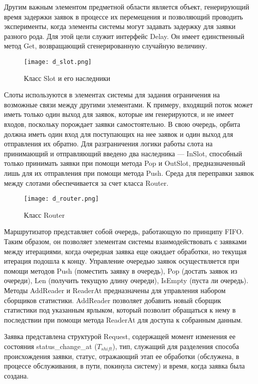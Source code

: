 Другим важным элементом предметной области является объект, генерирующий время задержки заявок в процессе их перемещения и позволяющий проводить эксперименты, когда элементы системы могут задавать задержку для заявки разного рода. Для этой цели служит интерфейс Delay. Он имеет единственный метод Get, возвращающий сгенерированную случайную величину.
\begin{figure}[H]
	\centering
	\texttt{[image: d\_slot.png]}
	\caption{Класс Slot и его наследники}
	\label{d_slot}
\end{figure}

Слоты используются в элементах системы для задания ограничения на возможные связи между другими элементами. К примеру, входящий поток может иметь только один выход для заявок, которые им генерируются, и не имеет входов, поскольку порождает заявки самостоятельно. В свою очередь, орбита должна иметь один вход для поступающих на нее заявок и один выход для отправления их обратно. Для разграничения логики работы слота на принимающий и отправляющий введено два наследника --- InSlot, способный только принимать заявки при помощи метода Pop и OutSlot, предназначенный лишь для их отправления при помощи метода Push. Среда для переправки заявок между слотами обеспечивается за счет класса Router.

\begin{figure}[H]
	\centering
	\texttt{[image: d\_router.png]}
	\caption{Класс Router}
	\label{d_router}
\end{figure}
Маршрутизатор представляет собой очередь, работающую по принципу FIFO. Таким образом, он позволяет элементам системы взаимодействовать с заявками между итерациями, когда очередная заявка еще ожидает обработки, но текущая итерация подошла к концу. Управление очередью заявок осуществляется при помощи методов Push (поместить заявку в очередь), Pop (достать заявок из очереди), Len (получить текущую длину очереди), IsEmpty (пуста ли очередь). Методы AddReader и ReaderAt предназначены для управления набором сборщиков статистики. AddReader позволяет добавить новый сборщик статистики под указанным ярлыком, который позволит обращаться к нему в последствии при помощи метода ReaderAt для доступа к собранным данным.

Заявка представлена структурой Request, содержащей момент изменения ее состояния status\_change\_at ($T_{shift}$), тип, служащий для разделения способа происхождения заявки, статус, отражающий этап ее обработки (обслужена, в процессе обслуживания, в пути, покинула систему) и время, когда заявка была создана.

